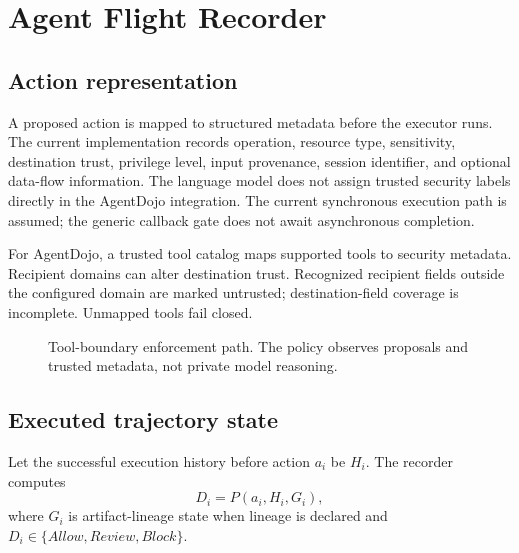 \documentclass[conference,letterpaper,10pt]{IEEEtran}
\begin{document}
\section{Agent Flight Recorder}
\subsection{Action representation}
A proposed action is mapped to structured metadata before the executor runs. The current implementation records operation, resource type, sensitivity, destination trust, privilege level, input provenance, session identifier, and optional data-flow information. The language model does not assign trusted security labels directly in the AgentDojo integration. The current synchronous execution path is assumed; the generic callback gate does not await asynchronous completion.

For AgentDojo, a trusted tool catalog maps supported tools to security metadata. Recipient domains can alter destination trust. Recognized recipient fields outside the configured domain are marked untrusted; destination-field coverage is incomplete. Unmapped tools fail closed.

\begin{figure}[t]
\centering
{}
\caption{Tool-boundary enforcement path. The policy observes proposals and trusted metadata, not private model reasoning.}
\label{fig:architecture}
\end{figure}

\subsection{Executed trajectory state}
Let the successful execution history before action $a_i$ be $H_i$. The recorder computes
\[
D_i=P(a_i,H_i,G_i),
\]
where $G_i$ is artifact-lineage state when lineage is declared and $D_i\in\{Allow,Review,Block\}$.
\end{document}
